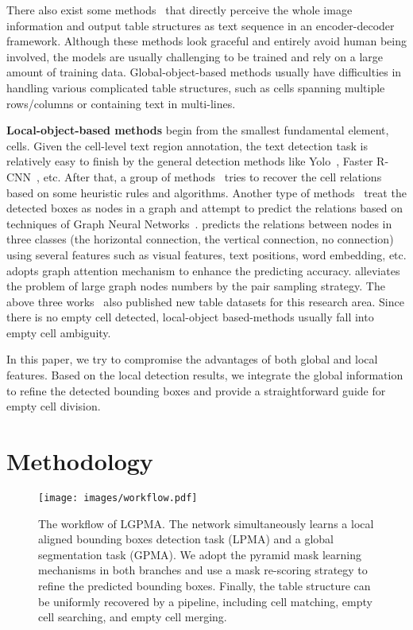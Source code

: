 \documentclass[runningheads]{llncs}
\begin{document}
There also exist some methods~\cite{LiCHWZL20,zhong2019image} that directly perceive the whole image information and output table structures as text sequence in an encoder-decoder framework. Although these methods look graceful and entirely avoid human being involved, the models are usually challenging to be trained and rely on a large amount of training data. Global-object-based methods usually have difficulties in handling various complicated table structures, such as cells spanning multiple rows/columns or containing text in multi-lines.

\textbf{Local-object-based methods} begin from the smallest fundamental element, cells. Given the cell-level text region annotation, the text detection task is relatively easy to finish by the general detection methods like Yolo~\cite{Redmon2016You}, Faster R-CNN~\cite{2015Faster}, etc. After that, a group of methods~\cite{xue2019res2tim,prasad2020cascadetabnet,zheng2020global} tries to recover the cell relations based on some heuristic rules and algorithms. Another type of methods~\cite{KociTL018,chi2019complicated,li2020gfte,qasim2019rethinking,raja2020table} treat the detected boxes as nodes in a graph and attempt to predict the relations based on techniques of Graph Neural Networks~\cite{ScarselliGTHM09}. \cite{li2020gfte} predicts the relations between nodes in three classes (the horizontal connection, the vertical connection, no connection) using several features such as visual features, text positions, word embedding, etc.  \cite{chi2019complicated} adopts graph attention mechanism to enhance the predicting accuracy. \cite{qasim2019rethinking} alleviates the problem of large graph nodes numbers by the pair sampling strategy. The above three works~\cite{li2020gfte,chi2019complicated,qasim2019rethinking} also published new table datasets for this research area. Since there is no empty cell detected, local-object based-methods usually fall into empty cell ambiguity.

In this paper, we try to compromise the advantages of both global and local features.   Based on the local detection results, we integrate the global information to refine the detected bounding boxes and provide a straightforward guide for empty cell division.

\section{Methodology}
\begin{figure*}[t]
\begin{center}
\texttt{[image: images/workflow.pdf]}\\
\end{center}
\caption{The workflow of LGPMA. The network simultaneously learns a local aligned bounding boxes detection task (LPMA) and a global segmentation task (GPMA). We adopt the pyramid mask learning mechanisms in both branches and use a mask re-scoring strategy to refine the predicted bounding boxes. Finally, the table structure can be uniformly recovered by a pipeline, including cell matching, empty cell searching, and empty cell merging.  }
\label{framework}
\end{figure*}
\end{document}

